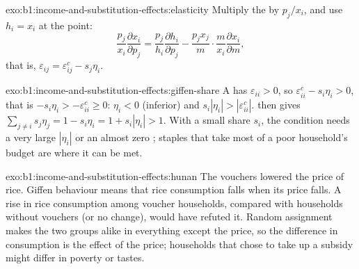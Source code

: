 \begin{solution}{exo:b1:income-and-substitution-effects:elasticity}
Multiply the  by $p_j/x_i$, and use $h_i = x_i$ at the point:
\[
\frac{p_j}{x_i}\frac{\partial x_i}{\partial p_j} = \frac{p_j}{h_i}\frac{\partial h_i}{\partial p_j} - \frac{p_jx_j}{m}\cdot\frac{m}{x_i}\frac{\partial x_i}{\partial m},
\]
that is, $\varepsilon_{ij} = \varepsilon^{c}_{ij} - s_j\eta_i$.
\end{solution}

\begin{solution}{exo:b1:income-and-substitution-effects:giffen-share}
A  has $\varepsilon_{ii} > 0$, so
$\varepsilon^{c}_{ii} - s_i\eta_i > 0$, that is $-s_i\eta_i > -\varepsilon^{c}_{ii} \ge 0$:
$\eta_i < 0$ (inferior) and $s_i|\eta_i| > |\varepsilon^{c}_{ii}|$. 
then gives $\sum_{j \neq i} s_j\eta_j = 1 - s_i\eta_i = 1 + s_i|\eta_i| > 1$. With a
small share $s_i$, the condition needs a very large $|\eta_i|$ or an almost
zero ; staples that take most of a poor household's
budget are where it can be met.
\end{solution}

\begin{solution}{exo:b1:income-and-substitution-effects:hunan}
The vouchers lowered the price of rice. Giffen behaviour means that rice
consumption falls when its price falls. A rise in rice consumption among
voucher households, compared with households without vouchers (or no
change), would have refuted it. Random assignment makes the two groups
alike in everything except the price, so the difference in consumption is
the effect of the price; households that chose to take up a subsidy might
differ in poverty or tastes.
\end{solution}

